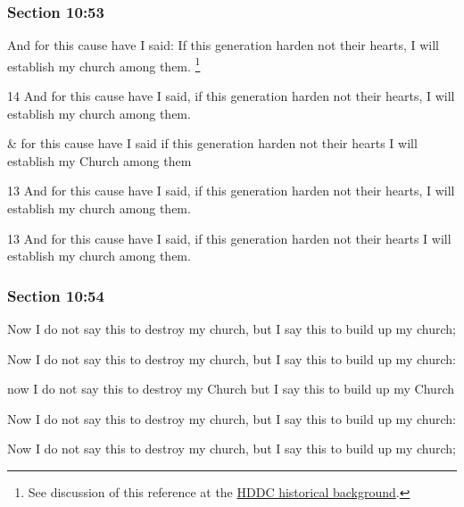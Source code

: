 	\subsubsection{Section 10:53} %
		\label{DC10-53}

		And for this cause have I said: If this generation harden not their hearts, I will establish my church among them.%
		\footnote{%
			See discussion of this reference at the \hyperref[DC10-HB-HDDC]{HDDC historical background}.
			} 

		\begin{framed}
		\scriptsize
			\begin{compactdesc}
				\item[JSP] 14 And for this cause have I said, if this generation harden not their hearts, I will establish my church among them.
				\item[RB1] \& for this cause have I said if this generation harden not their hearts I will establish my Church among them
				\item[DC 1835] 13 And for this cause have I said, if this generation harden not their hearts, I will establish my church among them.
				\item[DC 1844] 13 And for this cause have I said, if this generation harden not their hearts I will establish my church among them.
			\end{compactdesc}
		\end{framed}

	\subsubsection{Section 10:54} %
		\label{DC10-54}

		Now I do not say this to destroy my church, but I say this to build up my church;

		\begin{framed}
		\scriptsize
			\begin{compactdesc}
				\item[JSP] Now I do not say this to destroy my church, but I say this to build up my church: 
				\item[RB1] now I do not say this to destroy my Church but I say this to build up my Church
				\item[DC 1835] Now I do not say this to destroy my church, but I say this to build up my church: 
				\item[DC 1844] Now I do not say this to destroy my church, but I say this to build up my church; 
			\end{compactdesc}
		\end{framed}

